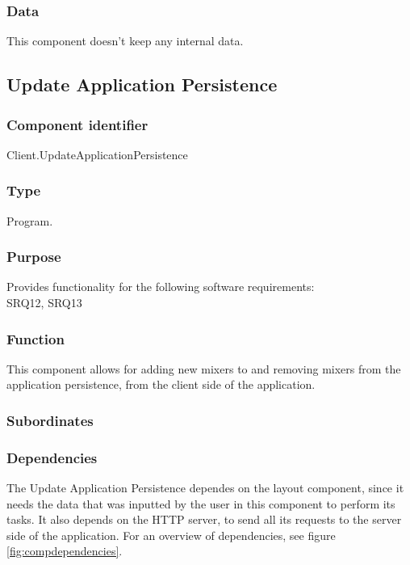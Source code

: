 \subsubsection*{Data}
This component doesn't keep any internal data.

\subsection{Update Application Persistence}

\subsubsection*{Component identifier}
Client.UpdateApplicationPersistence

\subsubsection*{Type}
Program.

\subsubsection*{Purpose}
Provides functionality for the following software requirements:\\
SRQ12, SRQ13

\subsubsection*{Function}
This component allows for adding new mixers to and removing mixers from the application persistence, from the client side of the application.

\subsubsection*{Subordinates}

\subsubsection*{Dependencies}
The Update Application Persistence dependes on the layout component, since it needs the data that was inputted by the user in this component to perform its tasks. It also depends on the HTTP server, to send all its requests to the server side of the application. For an overview of dependencies, see figure \ref{fig:compdependencies}.

